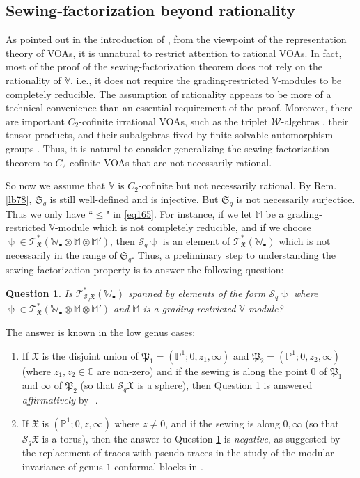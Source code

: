 \documentclass[11pt,b5paper,notitlepage]{article}
\theoremstyle{definition}
\theoremstyle{plain}
\newtheorem{que}[df]{Question}
\newcommand{\fk}{\mathfrak}
\newcommand{\mc}{\mathcal}
\newcommand{\scr}{\mathscr}
\newcommand{\blt}{\bullet}
\newcommand{\Vbb}{\mathbb V}
\newcommand{\Wbb}{\mathbb W}
\newcommand{\Mbb}{\mathbb M}
\newcommand{\Cbb}{\mathbb C}
\newcommand{\Pbb}{\mathbb P}
\newcommand{\<}{\left\langle}
\renewcommand{\>}{\right\rangle}
\newcommand{\fx}{\mathfrak{X}}
\numberwithin{equation}{section}
\begin{document}
\subsection{Sewing-factorization beyond rationality}


As pointed out in the introduction of \cite{HLZ1}, from the viewpoint of the representation theory of VOAs, it is unnatural to restrict attention to rational VOAs. In fact, most of the proof of the sewing-factorization theorem does not rely on the rationality of $\Vbb$, i.e., it does not require the grading-restricted $\Vbb$-modules to be completely reducible. The assumption of rationality appears to be more of a technical convenience than an essential requirement of the proof. Moreover, there are important $C_2$-cofinite irrational VOAs, such as the triplet $\mc W$-algebras \cite{AM-triplet}, their tensor products, and their subalgebras fixed by finite solvable automorphism groups \cite{Miy-C2-orbifold}. Thus, it is natural to consider generalizing the sewing-factorization theorem to $C_2$-cofinite VOAs that are not necessarily rational.


So now we assume that $\Vbb$ is $C_2$-cofinite but not necessarily rational. By Rem. \ref{lb78}, $\fk S_q$ is still well-defined and is injective. But $\fk S_q$ is not necessarily surjectice. Thus we only have ``$\leq$" in \eqref{eq165}. For instance, if we let $\Mbb$ be a grading-restricted $\Vbb$-module which is not completely reducible, and if we choose $\uppsi\in\scr T_{\fx}^*(\Wbb_\blt\otimes\Mbb\otimes \Mbb')$, then $\mc S_q\uppsi$ is an element of $\scr T_{\fx}^*(\Wbb_\blt)$ which is not necessarily in the range of $\fk S_q$. Thus, a preliminary step to understanding the sewing-factorization property is to answer the following question: 

\begin{que}\label{lb79}
Is $\scr T_{\mc S_q\fx}^*(\Wbb_\blt)$ spanned by elements of the form $\mc S_q\uppsi$ where $\uppsi\in\scr T_{\fx}^*(\Wbb_\blt\otimes\Mbb\otimes \Mbb')$ and $\Mbb$ is a grading-restricted $\Vbb$-module?
\end{que}


The answer is known in the low genus cases:
\begin{enumerate}[align=left, label=Case \arabic*.]
\item If $\fx$ is the disjoint union of $\fk P_1=(\Pbb^1;0,z_1,\infty)$ and $\fk P_2=(\Pbb^1;0,z_2,\infty)$ (where $z_1,z_2\in\Cbb$ are non-zero) and if the sewing is along the point $0$ of $\fk P_1$ and $\infty$ of $\fk P_2$ (so that $\mc S_q\fk X$ is a sphere), then Question \ref{lb79} is answered \emph{affirmatively} by \cite{HLZ1,HLZ2}-\cite{HLZ8}.
\item If $\fk X$ is $(\Pbb^1;0,z,\infty)$ where $z\neq 0$, and if the sewing is along $0,\infty$ (so that $\mc S_q\fx$ is a torus), then the answer to Question \ref{lb79} is \emph{negative}, as suggested by the replacement of traces with pseudo-traces in the study of the modular invariance of genus $1$ conformal blocks in \cite{Miy-modular-invariance,AN-pseudo-trace}.
\end{enumerate}
\end{document}
